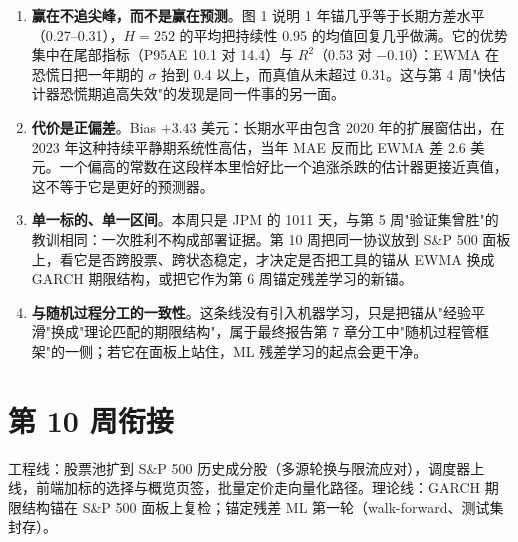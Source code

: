 \documentclass[11pt]{ctexart}
\begin{document}
\begin{enumerate}
  \item \textbf{赢在不追尖峰，而不是赢在预测}。图 1 说明 1 年锚几乎等于长期方差水平（0.27--0.31），$H=252$ 的平均把持续性 0.95 的均值回复几乎做满。它的优势集中在尾部指标（P95AE 10.1 对 14.4）与 $R^2$（0.53 对 $-0.10$）：EWMA 在恐慌日把一年期的 $\sigma$ 抬到 0.4 以上，而真值从未超过 0.31。这与第 4 周"快估计器恐慌期追高失效"的发现是同一件事的另一面。
  \item \textbf{代价是正偏差}。Bias $+3.43$ 美元：长期水平由包含 2020 年的扩展窗估出，在 2023 年这种持续平静期系统性高估，当年 MAE 反而比 EWMA 差 2.6 美元。一个偏高的常数在这段样本里恰好比一个追涨杀跌的估计器更接近真值，这不等于它是更好的预测器。
  \item \textbf{单一标的、单一区间}。本周只是 JPM 的 1011 天，与第 5 周"验证集曾胜"的教训相同：一次胜利不构成部署证据。第 10 周把同一协议放到 S\&P 500 面板上，看它是否跨股票、跨状态稳定，才决定是否把工具的锚从 EWMA 换成 GARCH 期限结构，或把它作为第 6 周锚定残差学习的新锚。
  \item \textbf{与随机过程分工的一致性}。这条线没有引入机器学习，只是把锚从"经验平滑"换成"理论匹配的期限结构"，属于最终报告第 7 章分工中"随机过程管框架"的一侧；若它在面板上站住，ML 残差学习的起点会更干净。
\end{enumerate}

\section{第 10 周衔接}

工程线：股票池扩到 S\&P 500 历史成分股（多源轮换与限流应对），调度器上线，前端加标的选择与概览页签，批量定价走向量化路径。理论线：GARCH 期限结构锚在 S\&P 500 面板上复检；锚定残差 ML 第一轮（walk-forward、测试集封存）。
\end{document}
